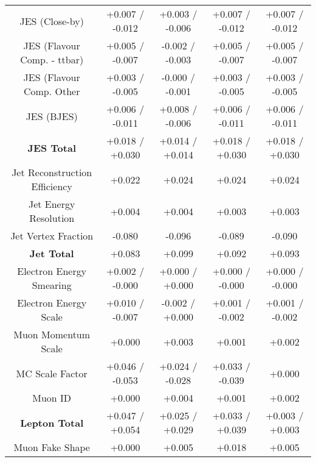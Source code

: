 \begin{table}[htbp]
\begin{center}
\begin{tabular}{|c|c|c|c|c|}
JES (Close-by)                        &+0.007   / -0.012   & +0.003   / -0.006   & +0.007   / -0.012   & +0.007   / -0.012  \\
JES (Flavour Comp. - ttbar)           &+0.005   / -0.007   & -0.002   / -0.003   & +0.005   / -0.007   & +0.005   / -0.007  \\
JES (Flavour Comp. Other              &+0.003   / -0.005   & -0.000   / -0.001   & +0.003   / -0.005   & +0.003   / -0.005  \\
JES (BJES)                            &+0.006   / -0.011   & +0.008   / -0.006   & +0.006   / -0.011   & +0.006   / -0.011  \\
\hline
\textbf{JES Total}                    &+0.018   / +0.030   & +0.014   / +0.014   & +0.018   / +0.030   & +0.018   / +0.030  \\
\hline
Jet Reconstruction Efficiency         &+0.022              & +0.024              & +0.024              & +0.024             \\
Jet Energy Resolution                 &+0.004              & +0.004              & +0.003              & +0.003             \\
Jet Vertex Fraction                   &-0.080              & -0.096              & -0.089              & -0.090             \\
\hline
\textbf{Jet Total}                    &+0.083              & +0.099              & +0.092              & +0.093             \\
\hline
Electron Energy Smearing              &+0.002   / -0.000   & +0.000   / +0.000   & +0.000   / -0.000   & +0.000   / -0.000  \\
Electron Energy Scale                 &+0.010   / -0.007   & -0.002   / +0.000   & +0.001   / -0.002   & +0.001   / -0.002  \\
Muon Momentum Scale                   &+0.000              & +0.003              & +0.001              & +0.002             \\
MC Scale Factor                       &+0.046   / -0.053   & +0.024   / -0.028   & +0.033   / -0.039   & +0.000             \\
Muon ID                               &+0.000              & +0.004              & +0.001              & +0.002             \\
\hline
\textbf{Lepton Total}                 &+0.047   / +0.054   & +0.025   / +0.029   & +0.033   / +0.039   & +0.003   / +0.003  \\
\hline
Muon Fake Shape                       &+0.000              & +0.005              & +0.018              & +0.005             \\

\end{tabular}
\end{center}
\end{table}
